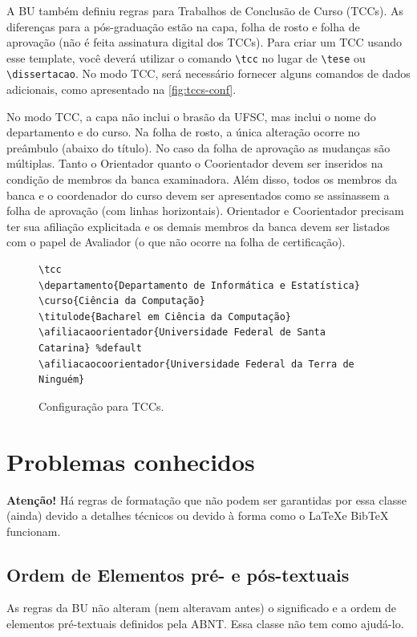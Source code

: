 \documentclass[embeddedlogo]{../ufsc-thesis-rn46-2019}
\newcommand{\lacmd}[1]{\texttt{\textbackslash{}#1}}
\begin{document}
A BU também definiu regras para Trabalhos de Conclusão de Curso (TCCs). As
diferenças para a pós-graduação estão na capa, folha de rosto e folha de
aprovação (não é feita assinatura digital dos TCCs). Para criar um TCC usando
esse template, você deverá utilizar o comando \lacmd{tcc} no lugar de
\lacmd{tese} ou \lacmd{dissertacao}. No modo TCC, será necessário fornecer
alguns comandos de dados adicionais, como apresentado na
\autoref{fig:tccs-conf}.

No modo TCC, a capa não inclui o brasão da UFSC, mas inclui o nome do
departamento e do curso. Na folha de rosto, a única alteração ocorre no
preâmbulo (abaixo do título). No caso da folha de aprovação as mudanças são
múltiplas. Tanto o Orientador quanto o Coorientador devem ser inseridos na
condição de membros da banca examinadora. Além disso, todos os membros da banca
e o coordenador do curso devem ser apresentados como se assinassem a folha de
aprovação (com linhas horizontais). Orientador e Coorientador precisam ter sua
afiliação explicitada e os demais membros da banca devem ser listados com o
papel de Avaliador (o que não ocorre na folha de certificação).

\begin{figure}[tb]
  \centering
  \caption{Configuração para TCCs.}
  \label{fig:tccs-conf}
\begin{verbatim}
\tcc
\departamento{Departamento de Informática e Estatística}
\curso{Ciência da Computação}
\titulode{Bacharel em Ciência da Computação}
\afiliacaoorientador{Universidade Federal de Santa Catarina} %default
\afiliacaocoorientador{Universidade Federal da Terra de Ninguém}
\end{verbatim}
\end{figure}





\chapter{Problemas conhecidos}
\label{ch:problems}

\textbf{Atenção!} Há regras de formatação que não podem ser garantidas por essa
classe (ainda) devido a detalhes técnicos ou devido à forma como o \LaTeX e
BibTeX funcionam.

\section{Ordem de Elementos pré- e pós-textuais}
As regras da BU não alteram (nem alteravam antes) o significado e a ordem de
elementos pré-textuais definidos pela ABNT. Essa classe não tem como ajudá-lo.
\end{document}
